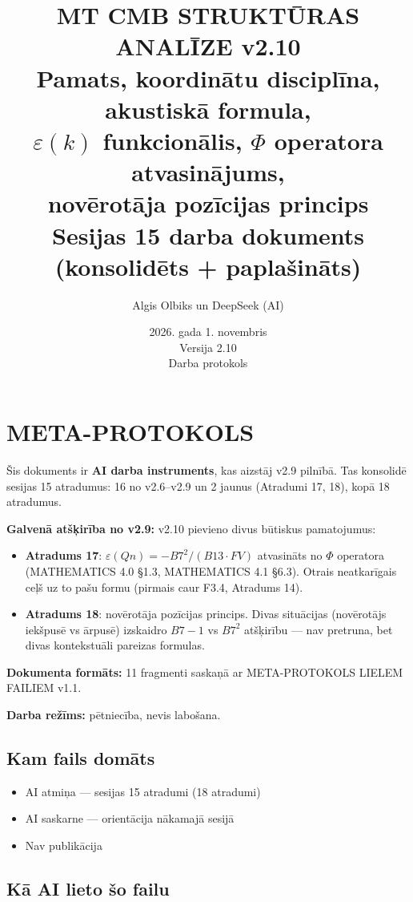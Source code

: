 \documentclass[12pt,a4paper]{article}
\title{\textbf{MT CMB STRUKTŪRAS ANALĪZE v2.10} \\
\large Pamats, koordinātu disciplīna, akustiskā formula, \\
$\varepsilon(k)$ funkcionālis, $\Phi$ operatora atvasinājums, \\
novērotāja pozīcijas princips \\
\normalsize Sesijas 15 darba dokuments (konsolidēts + paplašināts)}
\author{Algis Olbiks un DeepSeek (AI)}
\date{2026. gada 1. novembris \\ Versija 2.10 \\ \small Darba protokols}
\begin{document}
\maketitle

\section*{META-PROTOKOLS}

Šis dokuments ir \textbf{AI darba instruments}, kas aizstāj v2.9 pilnībā. Tas konsolidē sesijas 15 atradumus: 16 no v2.6–v2.9 un 2 jaunus (Atradumi 17, 18), kopā 18 atradumus.

\textbf{Galvenā atšķirība no v2.9:} v2.10 pievieno divus būtiskus pamatojumus:
\begin{itemize}
    \item \textbf{Atradums 17}: $\varepsilon(Qn) = -B7^2/(B13 \cdot FV)$ atvasināts no $\Phi$ operatora (MATHEMATICS 4.0 §1.3, MATHEMATICS 4.1 §6.3). Otrais neatkarīgais ceļš uz to pašu formu (pirmais caur F3.4, Atradums 14).
    \item \textbf{Atradums 18}: novērotāja pozīcijas princips. Divas situācijas (novērotājs iekšpusē vs ārpusē) izskaidro $B7-1$ vs $B7^2$ atšķirību — nav pretruna, bet divas kontekstuāli pareizas formulas.
\end{itemize}

\textbf{Dokumenta formāts:} 11 fragmenti saskaņā ar META-PROTOKOLS LIELEM FAILIEM v1.1.

\textbf{Darba režīms:} pētniecība, nevis labošana.

\subsection*{Kam fails domāts}

\begin{itemize}
    \item AI atmiņa — sesijas 15 atradumi (18 atradumi)
    \item AI saskarne — orientācija nākamajā sesijā
    \item Nav publikācija
\end{itemize}

\subsection*{Kā AI lieto šo failu}
\end{document}
